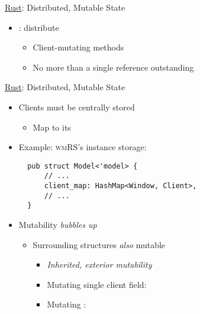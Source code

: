 \begin{frame}[fragile]{\underline{Rust}: Distributed, Mutable State \hfill {\footnotesize \currentname}}


    \begin{itemize}

    \item {}: distribute 
        \begin{itemize}
            \item Client-mutating methods
            \item No more than a single reference outstanding
        \end{itemize}

    \end{itemize}

    \vfill

\end{frame}

\begin{frame}[fragile]{\underline{Rust}: Distributed, Mutable State \hfill {\footnotesize \currentname}}


    \begin{itemize}

    \item Clients must be centrally stored
        \begin{itemize}
            \item Map  to its 
        \end{itemize}

    \item Example: \textsc{wmRS}'s  instance storage:\\[3pt]
\begin{verbatim}
  pub struct Model<'model> {
      // ...
      client_map: HashMap<Window, Client>,
      // ...
  }
\end{verbatim}

    \item Mutability \textit{bubbles up}
        \begin{itemize}
            \item Surrounding structures \textit{also} mutable
                \begin{itemize}
                    \item \textit{Inherited, exterior mutability}
                    \item Mutating single client field: 
                    \item Mutating : 
                \end{itemize}
        \end{itemize}

    \end{itemize}

    \vfill

\end{frame}

